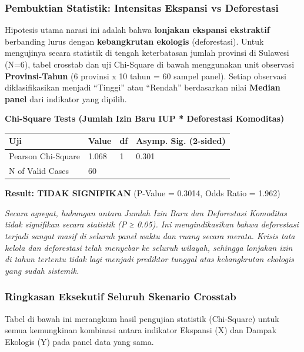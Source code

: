 \documentclass[
]{article}
\newcounter{none} %
\begin{document}
\subsubsection{Pembuktian Statistik: Intensitas Ekspansi vs
Deforestasi}\label{pembuktian-statistik-intensitas-ekspansi-vs-deforestasi}

Hipotesis utama narasi ini adalah bahwa \textbf{lonjakan ekspansi
ekstraktif} berbanding lurus dengan \textbf{kebangkrutan ekologis}
(deforestasi). Untuk mengujinya secara statistik di tengah keterbatasan
jumlah provinsi di Sulawesi (N=6), tabel crosstab dan uji Chi-Square di
bawah menggunakan unit observasi \textbf{Provinsi-Tahun} (6 provinsi x
10 tahun = 60 sampel panel). Setiap observasi diklasifikasikan menjadi
``Tinggi'' atau ``Rendah'' berdasarkan nilai \textbf{Median panel} dari
indikator yang dipilih.

\textbf{Chi-Square Tests (Jumlah Izin Baru IUP * Deforestasi Komoditas)}

{\def\LTcaptype{none} %
\begin{longtable}[]{@{}llll@{}}
\toprule\noalign{}
Uji & Value & df & Asymp. Sig. (2-sided) \\
\midrule\noalign{}
\endhead
\bottomrule\noalign{}
\endlastfoot
Pearson Chi-Square & 1.068 & 1 & 0.301 \\
N of Valid Cases & 60 & & \\
\end{longtable}
}

\textbf{Result: TIDAK SIGNIFIKAN} (P-Value = 0.3014, Odds Ratio = 1.962)

\emph{Secara agregat, hubungan antara Jumlah Izin Baru dan Deforestasi
Komoditas tidak signifikan secara statistik (P ≥ 0.05). Ini
mengindikasikan bahwa deforestasi terjadi sangat masif di seluruh panel
waktu dan ruang secara merata. Krisis tata kelola dan deforestasi telah
menyebar ke seluruh wilayah, sehingga lonjakan izin di tahun tertentu
tidak lagi menjadi prediktor tunggal atas kebangkrutan ekologis yang
sudah sistemik.}

\subsubsection{Ringkasan Eksekutif Seluruh Skenario
Crosstab}\label{ringkasan-eksekutif-seluruh-skenario-crosstab-1}

Tabel di bawah ini merangkum hasil pengujian statistik (Chi-Square)
untuk semua kemungkinan kombinasi antara indikator Ekspansi (X) dan
Dampak Ekologis (Y) pada panel data yang sama.
\end{document}
